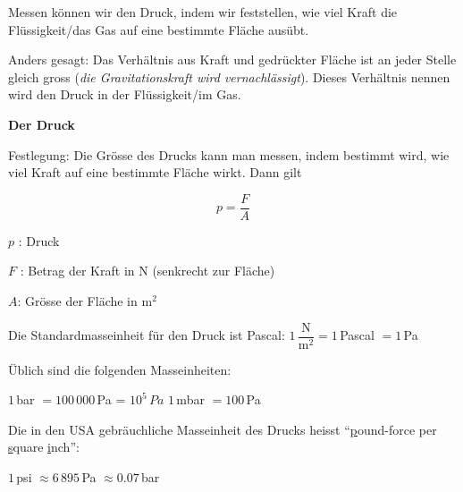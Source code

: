 \documentclass[11pt]{article}
\begin{document}
Messen können wir den Druck, indem wir feststellen, wie viel Kraft die Flüssigkeit/das Gas auf eine bestimmte Fläche ausübt. 


Anders gesagt: Das Verhältnis aus Kraft und gedrückter Fläche ist an jeder Stelle gleich gross (\textit{die Gravitationskraft wird vernachlässigt}). Dieses Verhältnis nennen wird den Druck in der Flüssigkeit/im Gas.






\begin{tcolorbox}[width=\textwidth, %
    colback=white,colframe=gray!75!black]
    \textbf{Der Druck}
    
    Festlegung:  Die Grösse des Drucks kann man messen, indem bestimmt wird, wie viel Kraft auf eine bestimmte Fläche wirkt. Dann gilt

    \vspace{-0.2cm}
    $$
    p = \dfrac{F}{A}
    $$

    \vspace{-0.2cm}
    $p$ : Druck
    
    $F$ : Betrag der Kraft in N (senkrecht zur Fläche)
    
    $A$: Grösse der Fläche in $\si{\meter}^2$
    
    Die Standardmasseinheit für den Druck ist Pascal: $1\,\dfrac{\si{\N}}{\si{\meter}^2} = 1\,$Pascal $= 1\,$Pa
    
    Üblich sind die folgenden Masseinheiten:
    
    $1\,$bar $= 100\,000\,$Pa = $10^5\,Pa$ \qquad 	$1\,$mbar $= 100\,$Pa
    
    Die in den USA gebräuchliche Masseinheit des Drucks heisst ``\underline{p}ound-force per \underline{s}quare \underline{i}nch'': 
    
    $1\,$psi $\approx 6\,895\,$Pa $\approx 0.07\,$bar

\end{tcolorbox}

\end{document}

